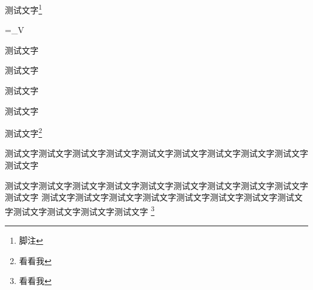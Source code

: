 \begin{Project}
\begin{Definition}
	测试文字\footnote{脚注}
	\begin{flalign}
		\Psi=\int_\Omega{}V
	\end{flalign}
\end{Definition}

\begin{Lemma}
	测试文字
\end{Lemma}

\begin{Theorem}[测试文字测试文字测试文字测试文字测试文字测试文字测试文字测试文字测试文字测试文字测试文字测试文字测试文字]
	测试文字
\end{Theorem}

\begin{Axiom}[测试文字][测试文字]
	测试文字
\end{Axiom}


\begin{Proposition}
	测试文字
\end{Proposition}


\begin{Corollary}
	\lipsum[1]
\end{Corollary}

\begin{Lemma}
	测试文字\footnote{看看我}
\end{Lemma}


\begin{Lemma*}[测试文字测试文字]
	测试文字测试文字测试文字测试文字测试文字测试文字测试文字测试文字测试文字测试文字
	
	测试文字测试文字测试文字测试文字测试文字测试文字测试文字测试文字测试文字测试文字
	\zhlipsum
	测试文字测试文字测试文字测试文字测试文字测试文字测试文字测试文字测试文字测试文字测试文字测试文字
	\tcblower
	\zhlipsum[2]
	\zhlipsum[2]\footnote{看看我}
\end{Lemma*}



\begin{linenumbers}
\lipsum[1]
\end{linenumbers}


\begin{Comprehension}
	\lipsum[1]
\end{Comprehension}




\end{Project}

